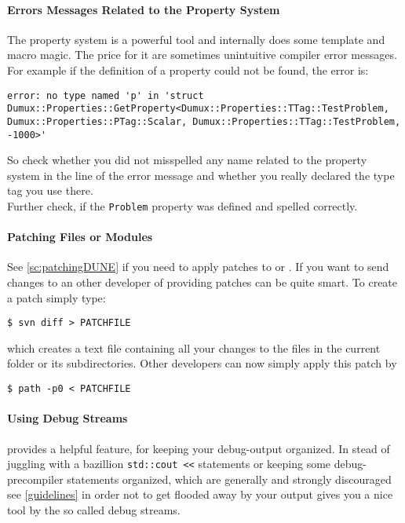 \paragraph{Errors Messages Related to the Property System}
The property system is a powerful tool and internally does some template and macro magic.
The price for it are sometimes unintuitive compiler error messages. For example if the
definition of a property could not be found, the error is:
\begin{lstlisting}[style=DumuxCode,numbers=none]
error: no type named 'p' in 'struct Dumux::Properties::GetProperty<Dumux::Properties::TTag::TestProblem, Dumux::Properties::PTag::Scalar, Dumux::Properties::TTag::TestProblem, -1000>'
\end{lstlisting}

\noindent So check whether you did not misspelled any name related to the property system in the
line of the error message and whether you really declared the type tag you use there.\\
Further check, if the \texttt{Problem} property was defined and spelled correctly.

\paragraph{Patching Files or Modules}
See \ref{sc:patchingDUNE} if you need to apply patches to \Dumux or \Dune.
If you want to send changes to an other developer of \Dumux providing patches
can be quite smart. To create a patch simply type:
\begin{lstlisting}[style=Bash]
$ svn diff > PATCHFILE
\end{lstlisting}
\noindent which creates a text file containing all your changes to the files
in the current folder or its subdirectories.
Other developers can now simply apply this patch by
\begin{lstlisting}[style=Bash]
$ path -p0 < PATCHFILE
\end{lstlisting}

\paragraph{Using \Dune Debug Streams}
\Dune provides a helpful feature, for keeping your debug-output organized.
  In stead of juggling with a bazillion \texttt{std::cout <<} statements or keeping some debug-precompiler statements organized, which are generally and strongly discouraged see \ref{guidelines} in order not to get
  flooded away by your output \Dune gives you a nice tool by the so called debug streams.

